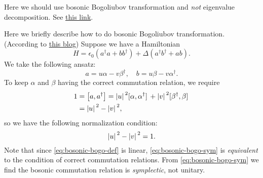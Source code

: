 \documentclass[hyperref, a4paper]{article}
\begin{document}
\begin{note*}{}
    Here we should use bosonic Bogoliubov transformation and \emph{not} eigenvalue decomposition.
    See \href{https://physics.stackexchange.com/questions/268268/bogoliubov-transformation-is-not-unitary-transformation-correct}{this link}.

    Here we briefly describe how to do bosonic Bogoliubov transformation. (According to \href{https://zhuanlan.zhihu.com/p/365350972}{this blog})
    Suppose we have a Hamiltonian 
    \begin{equation}
        H=\epsilon_{0}\left(a^{\dagger} a+b b^{\dagger}\right)+\Delta\left(a^{\dagger} b^{\dagger}+a b\right).
        \label{eq:bosonic-ham}
    \end{equation}
    We take the following ansatz:
    \begin{equation}
        {a}=u {\alpha}-v {\beta}^{\dagger}, \quad {b}=u {\beta}-v {\alpha}^{\dagger}.
        \label{eq:bosonic-bogo-def}
    \end{equation}
    To keep $\alpha$ and $\beta$ having the correct commutation relation, we require 
    \[
        \begin{aligned}
            1 &= \comm{a}{a^\dagger} = \abs*{u}^2 \comm*{\alpha}{\alpha^\dagger} + \abs*{v}^2 \comm*{\beta^\dagger}{\beta} \\
            &= \abs*{u}^2 - \abs*{v}^2,
        \end{aligned}
    \]
    so we have the following normalization condition:
    \begin{equation}
        \abs*{u}^2 - \abs*{v}^2 = 1.
        \label{eq:bosonic-bogo-sym}
    \end{equation}
    Note that since \eqref{eq:bosonic-bogo-def} is linear, \eqref{eq:bosonic-bogo-sym} is \emph{equivalent} 
    to the condition of correct commutation relations. From \eqref{eq:bosonic-bogo-sym} we find the bosonic 
    commutation relation is \emph{symplectic}, not unitary.


\end{note*}
\end{document}
